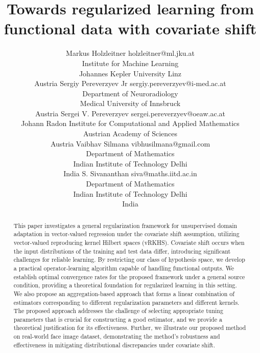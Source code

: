 \documentclass[twoside,11pt]{article}
\begin{document}
\title{Towards  regularized learning from functional data with covariate shift}

\author{
\name Markus Holzleitner \email holzleitner@ml.jku.at \\
\addr Institute for Machine Learning\\
Johannes Kepler University Linz\\
Austria
\AND
\name Sergiy Pereverzyev Jr \email sergiy.pereverzyev@i-med.ac.at \\
\addr Department of Neuroradiology\\
Medical University of Innsbruck\\
Austria
\AND
\name Sergei V. Pereverzyev \email sergei.pereverzyev@oeaw.ac.at \\
\addr Johann Radon Institute for Computational and Applied Mathematics\\
Austrian Academy of Sciences\\
Austria
\AND
\name Vaibhav Silmana \email vibhusilmana@gmail.com \\
\addr Department of Mathematics\\
Indian Institute of Technology Delhi\\
India
\AND
\name S. Sivananthan \email siva@maths.iitd.ac.in \\
\addr Department of Mathematics\\
Indian Institute of Technology Delhi\\
India
}



\maketitle

\begin{abstract}
This paper investigates a general regularization framework for unsupervised domain adaptation in vector-valued regression under the covariate shift assumption, utilizing vector-valued reproducing kernel Hilbert spaces (vRKHS).
Covariate shift occurs when the input distributions of the training and test data differ, introducing significant challenges for reliable learning. By restricting our class of hypothesis space, we develop a practical operator-learning algorithm capable of handling functional outputs. We establish optimal convergence rates for the proposed framework under a general source condition, providing a theoretical foundation for regularized learning in this setting. {We also propose an aggregation-based approach that forms a linear combination of estimators corresponding to different regularization parameters and different kernels. The proposed approach addresses the challenge of selecting appropriate tuning parameters that is crucial for constructing a good estimator, and we provide a theoretical justification for its effectiveness.} Further, we illustrate our proposed method 
 on real-world face image dataset, demonstrating the method’s robustness and effectiveness in mitigating distributional discrepancies under covariate shift. 
\end{abstract}
\end{document}
